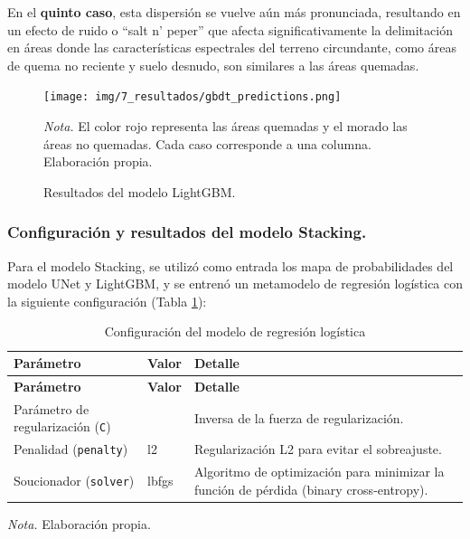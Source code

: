 En el \textbf{quinto caso}, esta dispersión se vuelve aún más pronunciada, resultando en un efecto de ruido o ``salt n' peper'' que afecta significativamente la delimitación en áreas donde las características 
espectrales del terreno circundante, como áreas de quema no reciente y suelo desnudo, son similares a las áreas quemadas.

\begin{figure}[H]
    \centering
    \caption{Resultados del modelo LightGBM.}
    \label{fig:lightgbm_resultados}
    \texttt{[image: img/7\_resultados/gbdt\_predictions.png]}
    \begin{flushleft}
        \vspace{-\baselineskip}
        \textit{Nota.} El color rojo representa las áreas quemadas y el morado las áreas no quemadas. Cada caso corresponde a una columna. Elaboración propia.
        \vspace{-\baselineskip}
    \end{flushleft}
\end{figure}

\subsubsection{Configuración y resultados del modelo Stacking.}

Para el modelo Stacking, se utilizó como entrada los mapa de probabilidades del modelo UNet y LightGBM, y se entrenó un metamodelo de regresión 
logística con la siguiente configuración (Tabla \ref{tab:config_logistic}):

\begin{longtable}{>{\raggedright\arraybackslash}p{5cm}>{\raggedright\arraybackslash}p{3cm}>{\raggedright\arraybackslash}p{7cm}}
    \caption{Configuración del modelo de regresión logística} \label{tab:config_logistic} \\
    \hline
    \textbf{Parámetro} & \textbf{Valor} & \textbf{Detalle} \\
    \hline
    \endfirsthead
    \hline
    \textbf{Parámetro} & \textbf{Valor} & \textbf{Detalle} \\
    \hline
    \endhead
    \hline
    \endfoot
    \hline
    \endlastfoot
    Parámetro de regularización (\texttt{C}) & 1.0 & Inversa de la fuerza de regularización. \\
    Penalidad (\texttt{penalty}) & l2 & Regularización L2 para evitar el sobreajuste. \\
    Soucionador (\texttt{solver}) & lbfgs & Algoritmo de optimización para minimizar la función de pérdida (binary cross-entropy). \\    
    \hline
\end{longtable}
\begin{flushleft}
    \textit{Nota.} Elaboración propia.
\end{flushleft}

